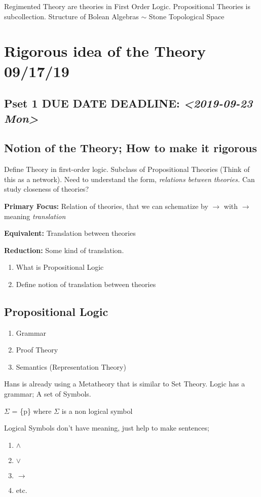 \documentclass[11pt]{article}
\begin{document}
Regimented Theory are theories in First Order Logic. Propositional Theories is subcollection.
Structure of Bolean Algebras \(\sim\) Stone Topological Space 
\section{Rigorous idea of the Theory 09/17/19}
\label{sec:org456e3ef}
\subsection{Pset 1 DUE DATE DEADLINE: \textit{<2019-09-23 Mon>}}
\label{sec:org613ee1a}
\subsection{Notion of the Theory; How to make it rigorous}
\label{sec:orgdff033c}
Define Theory in first-order logic. Subclass of Propositional Theories (Think of this as a network).
Need to understand the form, \emph{relations between theories.} Can study closeness of theories?

\textbf{Primary Focus:} Relation of theories, that we can schematize by \(\rightarrow\) with \(\rightarrow\) meaning \emph{translation}

\textbf{Equivalent:} Translation between theories

\textbf{Reduction:} Some kind of translation.

\begin{enumerate}
\item What is Propositional Logic
\item Define notion of translation between theories
\end{enumerate}
\subsection{Propositional Logic}
\label{sec:org79f0f84}
\begin{enumerate}
\item Grammar
\item Proof Theory
\item Semantics (Representation Theory)
\end{enumerate}

Hans is already using a Metatheory that is similar to Set Theory.
Logic has a grammar; A set of Symbols.

\(\Sigma\) = \{p\} where \(\Sigma\) is a non logical symbol

Logical Symbols don't have meaning, just help to make sentences;
\begin{enumerate}
\item \(\wedge\)
\item \(\vee\)
\item \(\rightarrow\)
\item etc.
\end{enumerate}
\end{document}
